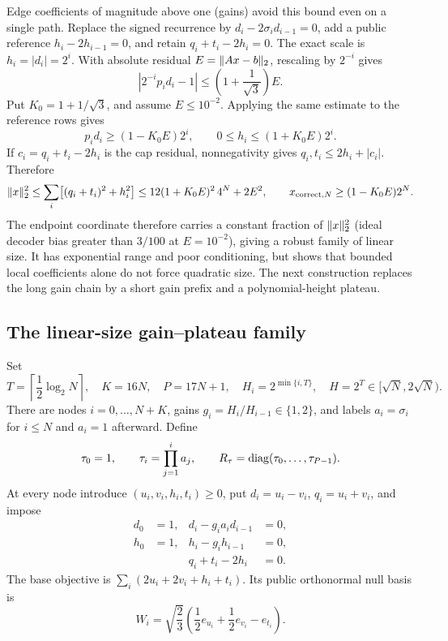 Edge coefficients of magnitude above one (gains) avoid this bound even on
a single path.  Replace the signed recurrence by
\(d_i-2\sigma_i d_{i-1}=0\), add a public reference
\(h_i-2h_{i-1}=0\), and retain \(q_i+t_i-2h_i=0\).  The exact scale is
\(h_i=|d_i|=2^i\).  With absolute residual
\(E=\lVert Ax-b\rVert_2\), rescaling by \(2^{-i}\) gives
\begin{equation}
 \left|2^{-i}p_id_i-1\right|
 \leq\left(1+\frac1{\sqrt3}\right)E.
\end{equation}
Put \(K_0=1+1/\sqrt3\), and assume \(E\leq10^{-2}\).  Applying the same
estimate to the reference rows gives
\[
 p_id_i\geq(1-K_0E)2^i,\qquad
 0\leq h_i\leq(1+K_0E)2^i.
\]
If \(c_i=q_i+t_i-2h_i\) is the cap residual, nonnegativity gives
\(q_i,t_i\leq2h_i+|c_i|\).  Therefore
\begin{equation}
 \lVert x\rVert_2^2
 \leq\sum_i\bigl[(q_i+t_i)^2+h_i^2\bigr]
 \leq12(1+K_0E)^2\,4^N+2E^2,
\qquad
 x_{{\rm correct},N}\geq(1-K_0E)2^N.
\end{equation}
The endpoint coordinate therefore carries a constant fraction of
\(\lVert x\rVert_2^2\) (ideal decoder bias greater than \(3/100\) at
\(E=10^{-2}\)), giving a robust family of linear size.  It has exponential
range and poor conditioning, but shows that bounded local coefficients alone
do not force quadratic size.  The next construction replaces the long gain
chain by a short gain prefix and a polynomial-height plateau.

\subsection{The linear-size gain--plateau family}
\label{sec:lp-gain-plateau}

Set
\begin{equation}
 T=\left\lceil\frac12\log_2N\right\rceil,
 \quad K=16N,\quad P=17N+1,
 \quad H_i=2^{\min\{i,T\}},\quad H=2^T\in[\sqrt N,2\sqrt N).
\end{equation}
There are nodes \(i=0,\ldots,N+K\), gains
\(g_i=H_i/H_{i-1}\in\{1,2\}\), and labels \(a_i=\sigma_i\) for
\(i\leq N\) and \(a_i=1\) afterward.  Define
\[
 \tau_0=1,\qquad \tau_i=\prod_{j=1}^i a_j,\qquad
 R_\tau=\operatorname{diag}(\tau_0,\ldots,\tau_{P-1}).
\]
At every node introduce
\((u_i,v_i,h_i,t_i)\geq0\), put \(d_i=u_i-v_i\), \(q_i=u_i+v_i\), and
impose
\begin{equation}
\begin{aligned}
 d_0&=1,&d_i-g_ia_id_{i-1}&=0,\\
 h_0&=1,&h_i-g_ih_{i-1}&=0,\\
 &&q_i+t_i-2h_i&=0.
\end{aligned}
\label{eq:lp-tag-9-20}
\end{equation}
The base objective is \(\sum_i(2u_i+2v_i+h_i+t_i)\).  Its public
orthonormal null basis is
\begin{equation}
 W_i=\sqrt{\frac23}\left(\frac12e_{u_i}+\frac12e_{v_i}-e_{t_i}\right).
 \label{eq:lp-gain-null}
\end{equation}

